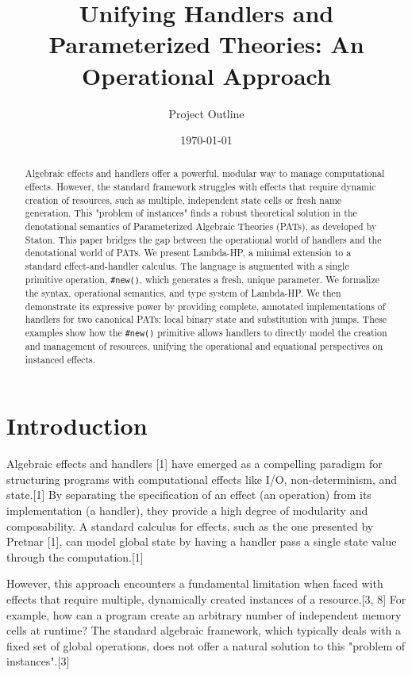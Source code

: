 \documentclass{article}
\title{Unifying Handlers and Parameterized Theories: An Operational Approach}
\author{Project Outline}
\date{\today}
\begin{document}
\maketitle

\begin{abstract}
Algebraic effects and handlers offer a powerful, modular way to manage computational effects. However, the standard framework struggles with effects that require dynamic creation of resources, such as multiple, independent state cells or fresh name generation. This "problem of instances" finds a robust theoretical solution in the denotational semantics of Parameterized Algebraic Theories (PATs), as developed by Staton. This paper bridges the gap between the operational world of handlers and the denotational world of PATs. We present Lambda-HP, a minimal extension to a standard effect-and-handler calculus. The language is augmented with a single primitive operation, \texttt{\#new()}, which generates a fresh, unique parameter. We formalize the syntax, operational semantics, and type system of Lambda-HP. We then demonstrate its expressive power by providing complete, annotated implementations of handlers for two canonical PATs: local binary state and substitution with jumps. These examples show how the \texttt{\#new()} primitive allows handlers to directly model the creation and management of resources, unifying the operational and equational perspectives on instanced effects.
\end{abstract}

\section{Introduction}
Algebraic effects and handlers [1] have emerged as a compelling paradigm for structuring programs with computational effects like I/O, non-determinism, and state.[1] By separating the specification of an effect (an operation) from its implementation (a handler), they provide a high degree of modularity and composability. A standard calculus for effects, such as the one presented by Pretnar [1], can model global state by having a handler pass a single state value through the computation.[1]

However, this approach encounters a fundamental limitation when faced with effects that require multiple, dynamically created instances of a resource.[3, 8] For example, how can a program create an arbitrary number of independent memory cells at runtime? The standard algebraic framework, which typically deals with a fixed set of global operations, does not offer a natural solution to this "problem of instances".[3]
\end{document}

